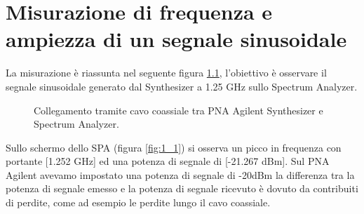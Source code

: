 \documentclass[11pt,a4paper,oneside]{book}
\begin{document}


\frontmatter 
\tableofcontents

\mainmatter


\chapter{Misurazione di frequenza e ampiezza di un segnale sinusoidale}
La misurazione è riassunta nel seguente figura \ref{fig:pna_sa}, l'obiettivo è osservare il segnale sinusoidale generato dal Synthesizer a 1.25 GHz sullo Spectrum Analyzer.


\begin{figure}[htbp]
    \centering
    \caption{Collegamento tramite cavo coassiale tra PNA Agilent Synthesizer e Spectrum Analyzer.}
    \label{fig:pna_sa}
\end{figure}

Sullo schermo dello SPA (figura \ref{fig:1_1}) si osserva un picco in frequenza con portante [1.252 GHz] ed una potenza di segnale di [-21.267 dBm]. Sul PNA Agilent avevamo impostato una potenza di segnale di -20dBm la differenza tra la potenza di segnale emesso e la potenza di segnale ricevuto è dovuto da contribuiti di perdite, come ad esempio le perdite lungo il cavo coassiale.
\end{document}

